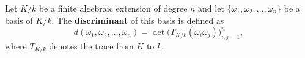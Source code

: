 Let $K/k$ be a finite algebraic extension of degree $n$ and let $\{\omega_1, \omega_2, \dots, \omega_n\}$ be a basis of $K/k$. The \textbf{discriminant} of this basis is defined as
$$d(\omega_1, \omega_2, \dots, \omega_n) = \det\big( T_{K/k}(\omega_i \omega_j) \big)_{i,j=1}^{n},$$
where $T_{K/k}$ denotes the trace from $K$ to $k$.
